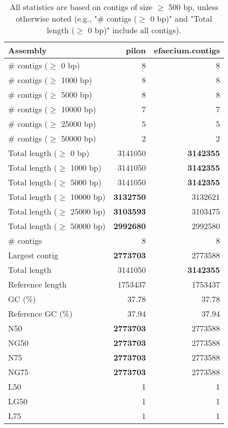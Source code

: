 \documentclass[12pt,a4paper]{article}
\begin{document}
\begin{table}[ht]
\begin{center}
\caption{All statistics are based on contigs of size $\geq$ 500 bp, unless otherwise noted (e.g., "\# contigs ($\geq$ 0 bp)" and "Total length ($\geq$ 0 bp)" include all contigs).}
\begin{tabular}{|l*{2}{|r}|}
\hline
Assembly & pilon & efaecium.contigs \\ \hline
\# contigs ($\geq$ 0 bp) & 8 & 8 \\ \hline
\# contigs ($\geq$ 1000 bp) & 8 & 8 \\ \hline
\# contigs ($\geq$ 5000 bp) & 8 & 8 \\ \hline
\# contigs ($\geq$ 10000 bp) & 7 & 7 \\ \hline
\# contigs ($\geq$ 25000 bp) & 5 & 5 \\ \hline
\# contigs ($\geq$ 50000 bp) & 2 & 2 \\ \hline
Total length ($\geq$ 0 bp) & 3141050 & {\bf 3142355} \\ \hline
Total length ($\geq$ 1000 bp) & 3141050 & {\bf 3142355} \\ \hline
Total length ($\geq$ 5000 bp) & 3141050 & {\bf 3142355} \\ \hline
Total length ($\geq$ 10000 bp) & {\bf 3132750} & 3132621 \\ \hline
Total length ($\geq$ 25000 bp) & {\bf 3103593} & 3103475 \\ \hline
Total length ($\geq$ 50000 bp) & {\bf 2992680} & 2992580 \\ \hline
\# contigs & 8 & 8 \\ \hline
Largest contig & {\bf 2773703} & 2773588 \\ \hline
Total length & 3141050 & {\bf 3142355} \\ \hline
Reference length & 1753437 & 1753437 \\ \hline
GC (\%) & 37.78 & 37.78 \\ \hline
Reference GC (\%) & 37.94 & 37.94 \\ \hline
N50 & {\bf 2773703} & 2773588 \\ \hline
NG50 & {\bf 2773703} & 2773588 \\ \hline
N75 & {\bf 2773703} & 2773588 \\ \hline
NG75 & {\bf 2773703} & 2773588 \\ \hline
L50 & 1 & 1 \\ \hline
LG50 & 1 & 1 \\ \hline
L75 & 1 & 1 \\ \hline

\end{tabular}
\end{center}
\end{table}
\end{document}
